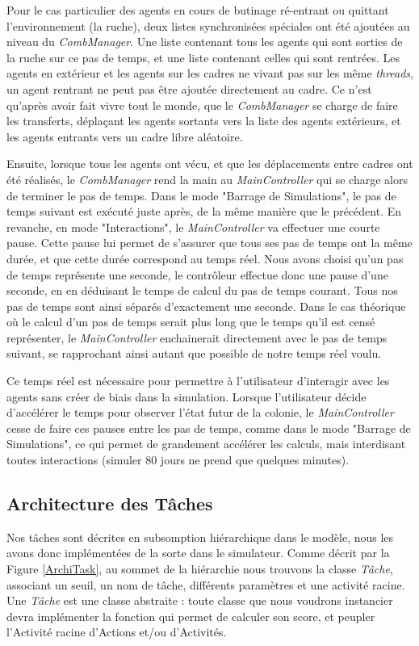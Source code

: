 			Pour le cas particulier des agents en cours de butinage ré-entrant ou quittant l'environnement (la ruche), deux listes synchronisées spéciales ont été ajoutées au niveau du \textit{CombManager}. Une liste contenant tous les agents qui sont sorties de la ruche sur ce pas de temps, et une liste contenant celles qui sont rentrées. Les agents en extérieur et les agents sur les cadres ne vivant pas sur les même \textit{threads}, un agent rentrant ne peut pas être ajoutée directement au cadre. Ce n'est qu'après avoir fait vivre tout le monde, que le \textit{CombManager} se charge de faire les transferts, déplaçant les agents sortants vers la liste des agents extérieurs, et les agents entrants vers un cadre libre aléatoire.
			
			Ensuite, lorsque tous les agents ont vécu, et que les déplacements entre cadres ont été réalisés, le \textit{CombManager} rend la main au \textit{MainController} qui se charge alors de terminer le pas de temps. Dans le mode "Barrage de Simulations", le pas de temps suivant est exécuté juste après, de la même manière que le précédent. En revanche, en mode "Interactions", le \textit{MainController} va effectuer une courte pause. Cette pause lui permet de s'assurer que tous ses pas de temps ont la même durée, et que cette durée correspond au temps réel. Nous avons choisi qu'un pas de temps représente une seconde, le contrôleur effectue donc une pause d'une seconde, en en déduisant le temps de calcul du pas de temps courant. Tous nos pas de temps sont ainsi séparés d'exactement une seconde. Dans le cas théorique où le calcul d'un pas de temps serait plus long que le temps qu'il est censé représenter, le \textit{MainController} enchainerait directement avec le pas de temps suivant, se rapprochant ainsi autant que possible de notre temps réel voulu.
			
			Ce temps réel est nécessaire pour permettre à l'utilisateur d'interagir avec les agents sans créer de biais dans la simulation. Lorsque l'utilisateur décide d'accélérer le temps pour observer l'état futur de la colonie, le \textit{MainController} cesse de faire ces pauses entre les pas de temps, comme dans le mode "Barrage de Simulations", ce qui permet de grandement accélérer les calculs, mais interdisant toutes interactions (simuler 80 jours ne prend que quelques minutes).
			
			\subsection{Architecture des Tâches}
			\label{subsectionImplemTasks}
			Nos tâches sont décrites en subsomption hiérarchique dans le modèle, nous les avons donc implémentées de la sorte dans le simulateur. Comme décrit par la Figure \ref{ArchiTask}, au sommet de la hiérarchie nous trouvons la classe \textit{Tâche}, associant un seuil, un nom de tâche, différents paramètres et une activité racine. Une \textit{Tâche} est une classe abstraite : toute classe que nous voudrons instancier devra implémenter la fonction qui permet de calculer son score, et peupler l'Activité racine d'Actions et/ou d'Activités.
			
